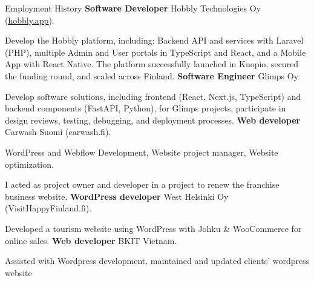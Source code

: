 \begin{rubric}{Employment History}
\entry*[04/25 - current]%
	\textbf{Software Developer} Hobbly Technologies Oy  ({\href{https://www.hobbly.app}{\underline{hobbly.app}}}).\par Develop the Hobbly platform, including: Backend API and services with Laravel (PHP), multiple Admin and User portals in TypeScript and React, and a Mobile App with React Native. The platform successfully launched in Kuopio, secured the funding round, and scaled across Finland.
\entry*[11/24 - 04/25]%
	\textbf{Software Engineer} Glimps Oy.\par Develop software solutions, including frontend (React, Next.js, TypeScript) and backend components (FastAPI, Python), for Glimps projects, participate in design reviews, testing, debugging, and deployment processes.
\entry*[11/21 - 10/23]%
	\textbf{Web developer} Carwash Suomi (carwash.fi).\par WordPress and Webflow Development, Website project manager, Website optimization.
    \par I acted as project owner and developer in a project to renew the franchise business website.
\entry*[2021]%
	\textbf{WordPress developer} West Helsinki Oy (VisitHappyFinland.fi).\par Developed a tourism website using WordPress with Johku \& WooCommerce for online sales.
\entry*[2019]%
	\textbf{Web developer} BKIT Vietnam.\par Assisted with Wordpress development, maintained and updated clients’ wordpress website
%
\end{rubric}